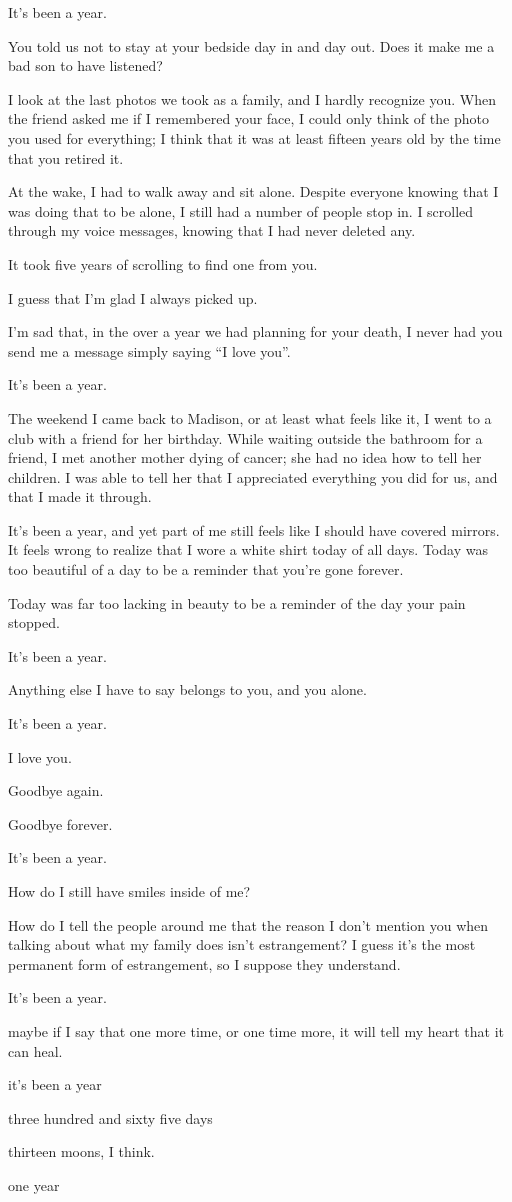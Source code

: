 \documentclass[12pt]{article}
\newcommand{\say}[1]{``#1''}
\renewcommand{\,}{\textsuperscript{,}}
\begin{document}
It's been a year.

You told us not to stay at your bedside day in and day out.  
Does it make me a bad son to have listened?

I look at the last photos we took as a family, and I hardly recognize you.  
When the friend asked me if I remembered your face, I could only think of the photo you used for everything; I think that it was at least fifteen years old by the time that you retired it.

At the wake, I had to walk away and sit alone.  
Despite everyone knowing that I was doing that to be alone, I still had a number of people stop in.  
I scrolled through my voice messages, knowing that I had never deleted any.

It took five years of scrolling to find one from you.

I guess that I'm glad I always picked up.

I'm sad that, in the over a year we had planning for your death, I never had you send me a message simply saying \say{I love you}.

It's been a year.

The weekend I came back to Madison, or at least what feels like it, I went to a club with a friend for her birthday.  
While waiting outside the bathroom for a friend, I met another mother dying of cancer; she had no idea how to tell her children.  
I was able to tell her that I appreciated everything you did for us, and that I made it through.

It's been a year, and yet part of me still feels like I should have covered mirrors.  
It feels wrong to realize that I wore a white shirt today of all days.  
Today was too beautiful of a day to be a reminder that you're gone forever.

Today was far too lacking in beauty to be a reminder of the day your pain stopped.

It's been a year.

Anything else I have to say belongs to you, and you alone.

It's been a year.

I love you.

Goodbye again.

Goodbye forever.

It's been a year.

How do I still have smiles inside of me?

How do I tell the people around me that the reason I don't mention you when talking about what my family does isn't estrangement?  
I guess it's the most permanent form of estrangement, so I suppose they understand.

It's been a year.

maybe if I say that one more time, or one time more, it will tell my heart that it can heal.

it's been a year

three hundred and sixty five days

thirteen moons, I think.

one year
\end{document}
